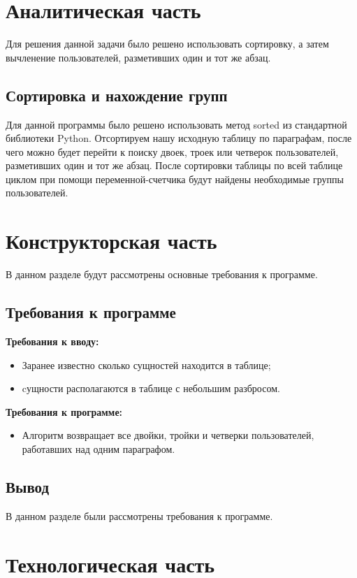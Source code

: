 \documentclass[12pt]{report}
\begin{document}
\chapter{Аналитическая часть}
Для решения данной задачи было решено использовать сортировку, а затем вычленение пользователей, разметивших один и тот же абзац.

\section{Сортировка и нахождение групп} 
Для данной программы было решено использовать метод sorted из стандартной библиотеки Python. Отсортируем нашу исходную таблицу по параграфам, после чего можно будет перейти к поиску двоек, троек или четверок пользователей, разметивших один и тот же абзац. После сортировки таблицы по всей таблице циклом при помощи переменной-счетчика будут найдены необходимые группы пользователей.

\chapter{Конструкторская часть}
В данном разделе будут рассмотрены основные требования к программе.

\section{Требования к программе}
\textbf{Требования к вводу:}
\begin{itemize}
	\item Заранее известно сколько сущностей находится в таблице;
	\item cущности располагаются в таблице с небольшим разбросом.
\end{itemize}

\textbf{Требования к программе:}
\begin{itemize}
	\item Алгоритм возвращает все двойки, тройки и четверки пользователей, работавших над одним параграфом.
\end{itemize}


\section*{Вывод}
В данном разделе были рассмотрены требования к программе.


\chapter{Технологическая часть}
\end{document}
